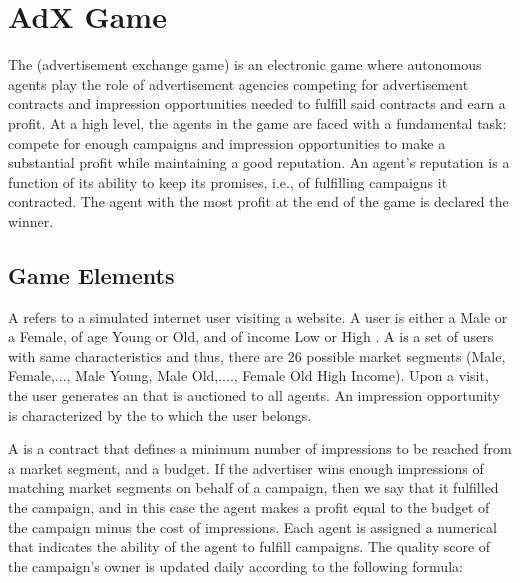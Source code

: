 



\maketitle

\section{AdX Game}

The  (advertisement exchange game) is an electronic game where autonomous agents 
play the role of advertisement agencies competing for advertisement contracts 
and impression opportunities needed to fulfill said contracts and earn a profit. 
At a high level, the agents in the game are faced with a fundamental task:
compete for enough campaigns and impression opportunities to make a substantial 
profit while maintaining a good reputation. An agent's reputation is a function
of its ability to keep its promises, i.e., of fulfilling campaigns it contracted.
The agent with the most profit at the end of the game is declared the winner.

\subsection{Game Elements}

A  refers to a simulated internet user visiting a website.
A user is either a Male or a Female, of age Young or Old, and of income Low or High .
A  is a set of users with same characteristics and thus, 
there are 26 possible market segments 
(Male, Female,..., Male Young, Male Old,...., Female Old High Income).
Upon a visit, the user generates an  that is
auctioned to all agents. An impression opportunity is characterized by the 
 to which the user belongs.

A  is a contract that defines a minimum number of impressions
to be reached from a market segment, and a budget. If the advertiser wins enough 
impressions of matching market segments on behalf of a campaign, then we say 
that it fulfilled the campaign, and in this case the agent makes a profit equal to the 
budget of the campaign minus the cost of impressions. Each agent is assigned a 
numerical  that indicates the ability of the agent to fulfill campaigns. 
The quality score of the campaign's owner is updated daily according to the following formula:


